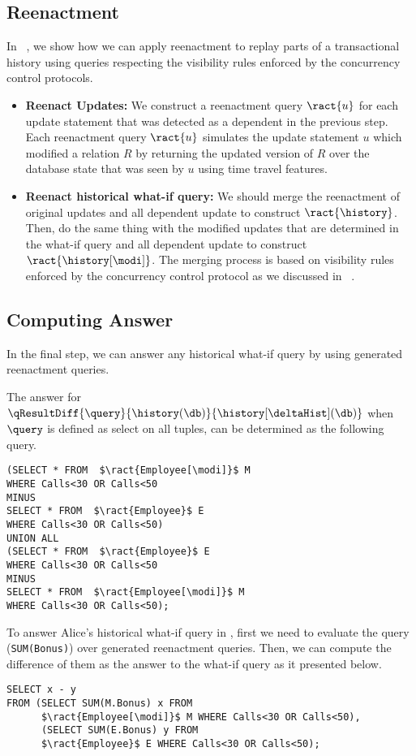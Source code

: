 \subsection{Reenactment}
\label{sec:reenactment}
In ~\cite{AG14,AG16,AG17}, we show how we can apply reenactment to replay parts of a transactional history using queries respecting the visibility rules enforced by the concurrency control protocols.
%
\begin{itemize}
\item \textbf{Reenact Updates:} We construct a reenactment query $\ract{u}$ for each update statement that was detected as a dependent in the previous step. Each reenactment query $\ract{u}$ simulates the update statement $u$ which modified a relation $R$ by returning the updated version of $R$ over the database state that was seen by $u$ using time travel features.
\item \textbf{Reenact historical what-if query:} We should merge the reenactment of original updates and all dependent update to construct $\ract{\history}$. Then, do the same thing with the modified updates that are determined in the what-if query and all dependent update to construct $\ract{\history[\modi]}$. The merging process is based on visibility rules enforced by the concurrency control protocol as we discussed in ~\cite{AG16,AG17}.
\end{itemize}

\subsection{Computing Answer}
\label{sec:answer}
In the final step, we can answer any historical what-if query by using generated reenactment queries.
\begin{exam}
The answer for $\qResultDiff{\query}{\history(\db)}{\history[\deltaHist](\db)}$ when $\query$ is defined as select on all tuples, can be determined as the following query.
\begin{lstlisting}
(SELECT * FROM  $\ract{Employee[\modi]}$ M
WHERE Calls<30 OR Calls<50
MINUS
SELECT * FROM  $\ract{Employee}$ E
WHERE Calls<30 OR Calls<50)
UNION ALL
(SELECT * FROM  $\ract{Employee}$ E
WHERE Calls<30 OR Calls<50
MINUS
SELECT * FROM  $\ract{Employee[\modi]}$ M
WHERE Calls<30 OR Calls<50);
\end{lstlisting}
To answer Alice's historical what-if query in , first we need to evaluate the query (\lstinline!SUM(Bonus)!) over generated reenactment queries. Then, we can compute the difference of them as the answer to the what-if query as it presented below.
\begin{lstlisting}
SELECT x - y
FROM (SELECT SUM(M.Bonus) x FROM
	  $\ract{Employee[\modi]}$ M WHERE Calls<30 OR Calls<50),
      (SELECT SUM(E.Bonus) y FROM
      $\ract{Employee}$ E WHERE Calls<30 OR Calls<50);
\end{lstlisting}
\end{exam}


